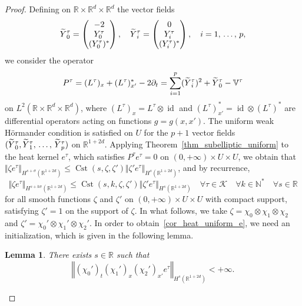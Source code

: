 \documentclass[10pt]{amsart}
\newtheorem{lemm}[theo]{Lemma}\newtheorem{prop}[theo]{Proposition}\newtheorem{coro}[theo]{Corollary}\newtheorem{conj}[theo]{Conjecture}
\theoremstyle{definition}\newtheorem{defi}[theo]{Definition}\newtheorem{rema}[theo]{Remark}\newtheorem{exam}[theo]{Example}\newtheorem{exem}[theo]{Example}\newtheorem{nota}[theo]{Notation}
\newcommand*\R{\mathbb{R}}
\newcommand*\N{\mathbb{N}}
\newcommand{\bbV}{\mathbb{V}}
\newcommand{\calK}{\mathcal{K}}
\DeclareMathOperator{\Cst}{Cst}
\DeclareMathOperator{\id}{id}
\renewcommand{\leq}{\leqslant}
\let\oldtilde\tilde
\renewcommand*{\tilde}[1]{\mathchoice{\widetilde{#1}}{\widetilde{#1}}{\oldtilde{#1}}{\oldtilde{#1}}}
\let\oldforall\forall
\renewcommand*{\forall}{\mathrel{\oldforall}}
\begin{document}
\begin{proof}
Defining on $\R\times\R^d\times\R^d$ the vector fields
\[
\tilde Y_0^\tau=
\begin{pmatrix} -2\\ Y_0^\tau\\
(Y_0^\tau)^*
\end{pmatrix},\quad
\tilde Y_i^\tau=
\begin{pmatrix} 0 \\ Y_i^\tau\\ (Y_i^\tau)^*
\end{pmatrix},\quad i=1,\,\ldots,\,p,
\]
we consider the operator
\[
P^\tau = (L^\tau)_x + (L^\tau)^*_{x'} - 2 \partial_t=\sum_{i=1}^p (\tilde Y_i^\tau)^2+\tilde Y_0^\tau - \bbV^\tau
\]
on $L^2(\R\times\R^d\times\R^d)$, where $(L^\tau)_x = L^\tau\otimes\id$ and $(L^\tau)^*_{x'}=\id\otimes (L^\tau)^*$ are differential operators acting on functions $g=g(x,x')$. The uniform weak H\"ormander condition is satisfied on $U$ for the $p+1$ vector fields $(\tilde Y_0^\tau,\tilde Y_1^\tau,\,\ldots,\,\tilde Y_p^\tau)$ on $\R^{1+2d}$. Applying Theorem~\ref{thm_subelliptic_uniform} to the heat kernel $e^\tau$, which satisfies $P^\tau e^\tau=0$ on $(0,+\infty)\times U\times U$, we obtain that $\Vert\zeta e^\tau\Vert_{H^{s+\sigma}(\R^{1+2d})} \leq\Cst(s,\zeta,\zeta')\Vert \zeta' e^\tau\Vert_{H^s(\R^{1+2d})}$, and by recurrence,
\[
\Vert\zeta e^\tau\Vert_{H^{s+k\sigma}\left(\R^{1+2d}\right)} \leq \Cst(s,k,\zeta,\zeta') \Vert \zeta' e^\tau\Vert_{H^s\left(\R^{1+2d}\right)} \quad\forall\tau\in\calK\quad \forall k\in\N^* \quad \forall s\in\R
\]
for all smooth functions $\zeta$ and $\zeta'$ on $(0,+\infty)\times U\times U$ with compact support, satisfying $\zeta'=1$ on the support of $\zeta$. In what follows, we take $\zeta=\chi_0\otimes\chi_1\otimes\chi_2$ and $\zeta'=\chi_0'\otimes\chi_1'\otimes\chi_2'$. In order to obtain~\eqref{cor_heat_uniform_e}, we need an initialization, which is given in the following lemma.

\begin{lemm}\label{lemma_init}
There exists $s\in\R$ such that
\[
\left\Vert (\chi_0')_t (\chi_1')_x (\chi_2')_{x'} e^\tau\right\Vert_{H^s\left(\R^{1+2d}\right)}<+\infty.
\]
\end{lemm}


\end{proof}
\end{document}
